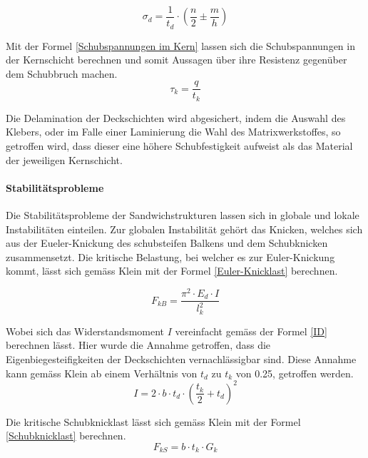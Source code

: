     \begin{equation}
      \label{Spannung in Deckschicht}
      \sigma_d = \frac{1}{t_d}\cdot \left ( \frac{n}{2} \pm \frac{m}{h}\right )
    \end{equation}

    Mit der Formel \ref{Schubspannungen im Kern} lassen sich die Schubspannungen in der Kernschicht berechnen und somit Aussagen über ihre Resistenz gegenüber dem Schubbruch machen.
    \begin{equation}
      \label{Schubspannungen im Kern}
      \tau_k = \frac{q}{t_k}
    \end{equation}

    Die Delamination der Deckschichten wird abgesichert, indem die Auswahl des Klebers, oder im Falle einer Laminierung die Wahl des Matrixwerkstoffes, so getroffen wird, dass dieser eine höhere Schubfestigkeit aufweist als das Material der jeweiligen Kernschicht.

    \paragraph{Stabilitätsprobleme}
    Die Stabilitätsprobleme der Sandwichstrukturen lassen sich in globale und lokale Instabilitäten einteilen. Zur globalen Instabilität gehört das Knicken, welches sich aus der Eueler-Knickung des schubsteifen Balkens und dem Schubknicken zusammensetzt. Die kritische Belastung, bei welcher es zur Euler-Knickung kommt, lässt sich gemäss Klein \cite{klein} mit der Formel \ref{Euler-Knicklast} berechnen.

    \begin{equation}
      \label{Euler-Knicklast}
      F_{kB}=\frac{\pi^2 \cdot E_d \cdot I}{l_k^{2}}
    \end{equation}

    Wobei sich das Widerstandsmoment $I$ vereinfacht gemäss der Formel \ref{ID} berechnen lässt. Hier wurde die Annahme getroffen, dass die Eigenbiegesteifigkeiten der Deckschichten vernachlässigbar sind. Diese Annahme kann gemäss Klein \cite{klein} ab einem Verhältnis von $t_d$ zu $t_k$ von 0.25, getroffen werden.
    \begin{equation}
      \label{ID}
      I= 2 \cdot b \cdot t_d \cdot \left( \frac{t_k}{2} + t_d \right )^{2}
    \end{equation}

    Die kritische Schubknicklast lässt sich gemäss Klein \cite{klein} mit der Formel \ref{Schubknicklast} berechnen.
    \begin{equation}
      \label{Schubknicklast}
      F_{kS} = b \cdot t_k \cdot G_k
    \end{equation}

